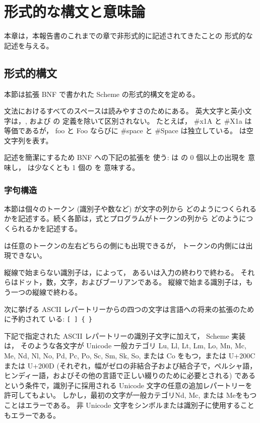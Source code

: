 \chapter{形式的な構文と意味論}
\label{formalchapter}

本章は，本報告書のこれまでの章で非形式的に記述されてきたことの
形式的な記述を与える。



\section{形式的構文}
\label{BNF}

本節は拡張 BNF で書かれた Scheme の形式的構文を定める。

文法におけるすべてのスペースは読みやすさのためにある。
英大文字と英小文字は，,  および の
定義を除いて区別されない。
たとえば， {\cf \#x1A} と {\cf \#X1a} は等価であるが，
{\cf foo} と {\cf Foo} ならびに {\cf \#\backwhack{}space} と {\cf \#\backwhack{}Space}
は独立している。
 は空文字列を表す。

記述を簡潔にするため BNF への下記の拡張を
使う:   は  の 0 個以上の出現を
意味し， は少なくとも 1 個の  を
意味する。


\subsection{字句構造}

本節は個々のトークン (識別子や数など) が文字の列から
どのようにつくられるかを記述する。続く各節は，式とプログラムがトークンの列から
どのようにつくられるかを記述する。

 は任意のトークンの左右どちらの側にも出現できるが，
トークンの内側には出現できない。

\vest 縦線で始まらない識別子は，によって，
あるいは入力の終わりで終わる。
それらはドット，数，文字，およびブーリアンである。
縦線で始まる識別子は，もう一つの縦線で終わる。

次に挙げる ASCII レパートリーからの四つの文字は言語への将来の拡張のために予約されて
いる: {\tt \verb"[" \verb"]" \verb"{" \verb"}"}

下記で指定された ASCII レパートリーの識別子文字に加えて，
Scheme 実装は，
そのような各文字が Unicode 一般カテゴリ
Lu, Ll, Lt, Lm, Lo, Mn, Mc, Me, Nd, Nl, No, Pd, Pc, Po, Sc, Sm, Sk, So,
または Co をもつ，または U+200C または U+200D
(それぞれ，幅がゼロの非結合子および結合子で，ペルシャ語，ヒンディー語，およびその他の言語で正しい綴りのために必要とされる)
であるという条件で，識別子に採用される Unicode 文字の任意の追加レパートリーを許可してもよい。
しかし，最初の文字が一般カテゴリNd, Mc, または Meをもつことはエラーである。
非 Unicode 文字をシンボルまたは識別子に使用することもエラーである。

